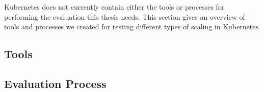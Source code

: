 Kubernetes does not currently contain either the tools or processes for
performing the evaluation this thesis needs.
This section gives an overview of tools and processes
we created for testing different types of scaling in Kubernetes.

\subsection{Tools}
\label{evaluation-methodology-tools}



\subsection{Evaluation Process}


